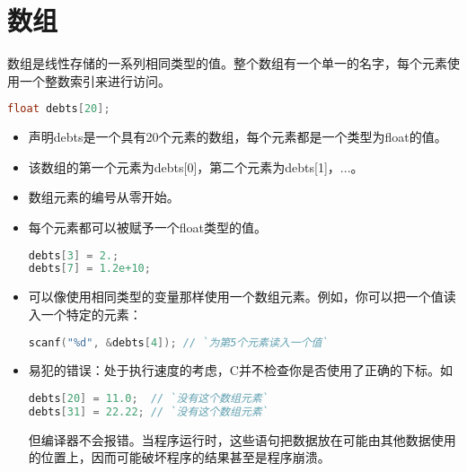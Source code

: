 \section{数组}
\begin{frame}[fragile]\ft{\secname}
数组是线性存储的一系列相同类型的值。整个数组有一个单一的名字，每个元素使用一个整数索引来进行访问。
\end{frame}

\begin{frame}[fragile]
\begin{lstlisting}[language=c,backgroundcolor=\color{red!10}]
float debts[20];
\end{lstlisting}

\begin{itemize}
\item
声明debts是一个具有20个元素的数组，每个元素都是一个类型为float的值。\\[0.1in]
\item
该数组的第一个元素为debts[0]，第二个元素为debts[1]，...。\\[0.1in]
\item
\textcolor{acolor1}{数组元素的编号从零开始}。\\[0.1in]
\item 每个元素都可以被赋予一个float类型的值。
\begin{lstlisting}[language=c,backgroundcolor=\color{red!10}]
debts[3] = 2.;
debts[7] = 1.2e+10;
\end{lstlisting}
\end{itemize}
\end{frame}

\begin{frame}[fragile]\ft{\secname}
\begin{itemize}
\item
可以像使用相同类型的变量那样使用一个数组元素。例如，你可以把一个值读入一个特定的元素：
\begin{lstlisting}[language=c,backgroundcolor=\color{red!10}]
scanf("%d", &debts[4]); // `为第5个元素读入一个值`
\end{lstlisting} 
\end{itemize}

\end{frame}

\begin{frame}[fragile]\ft{\secname}
\begin{itemize}
\item
易犯的错误：处于执行速度的考虑，C并不检查你是否使用了正确的下标。如
\begin{lstlisting}[language=c,backgroundcolor=\color{red!10}]
debts[20] = 11.0;  // `没有这个数组元素`
debts[31] = 22.22; // `没有这个数组元素`
\end{lstlisting}
但编译器不会报错。当程序运行时，这些语句把数据放在可能由其他数据使用的位置上，因而可能破坏程序的结果甚至是程序崩溃。
\end{itemize}
\end{frame}

